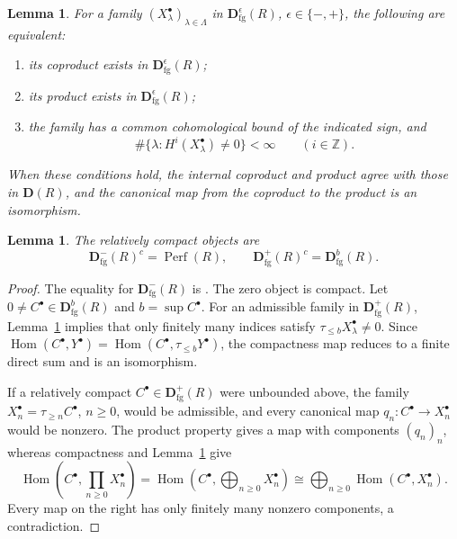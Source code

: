 \documentclass[11pt]{amsart}
\numberwithin{equation}{section}
\newtheorem{lemma}[theorem]{Lemma}
\theoremstyle{definition}
\theoremstyle{remark}
\DeclareMathOperator{\Perf}{Perf}
\DeclareMathOperator{\Hom}{Hom}
\newcommand{\D}{\mathbf D}
\newcommand{\fg}{\mathrm{fg}}
\begin{document}
\begin{lemma}\label{lem:admissible-coproducts}
For a family $(X^{\bullet}_\lambda)_{\lambda\in\Lambda}$ in
$\D^\epsilon_{\fg}(R)$, $\epsilon\in\{-,+\}$, the following are equivalent:
\begin{enumerate}[label=(\roman*),leftmargin=*]
\item its coproduct exists in $\D^\epsilon_{\fg}(R)$;
\item its product exists in $\D^\epsilon_{\fg}(R)$;
\item the family has a common cohomological bound of the indicated sign, and
\begin{equation}\label{eq:admissible}
 \#\{\lambda:H^i(X^{\bullet}_\lambda)\ne0\}<\infty
 \qquad(i\in\mathbb Z).
\end{equation}
\end{enumerate}
When these conditions hold, the internal coproduct and product agree
with those in $\D(R)$, and the canonical map from the coproduct to the
product is an isomorphism.
\end{lemma}

\begin{lemma}\label{lem:relative-compact-objects}
The relatively compact objects are
\[
 \D^-_{\fg}(R)^c=\Perf(R),\qquad
 \D^+_{\fg}(R)^c=\D^b_{\fg}(R).
\]
\end{lemma}
\begin{proof}
The equality for $\D^-_{\fg}(R)$ is \cite[Proposition~2.1]{MT17}.
The zero object is compact. Let $0\ne C^{\bullet}\in\D^b_{\fg}(R)$
and $b=\sup C^{\bullet}$.
For an admissible family in $\D^+_{\fg}(R)$, Lemma~\ref{lem:admissible-coproducts}
implies that only finitely many indices satisfy
$\tau_{\leq b}X^{\bullet}_\lambda\ne0$.
Since $\Hom(C^{\bullet},Y^{\bullet})=
\Hom(C^{\bullet},\tau_{\leq b}Y^{\bullet})$, the compactness map reduces
to a finite direct sum and is an isomorphism.

If a relatively compact $C^{\bullet}\in\D^+_{\fg}(R)$ were unbounded
above, the family $X^{\bullet}_n=\tau_{\geq n}C^{\bullet}$, $n\geq0$,
would be admissible, and every canonical map
$q_n:C^{\bullet}\to X^{\bullet}_n$ would be nonzero.
The product property gives a map with components $(q_n)_n$, whereas
compactness and Lemma~\ref{lem:admissible-coproducts} give
\[
 \Hom\!\left(C^{\bullet},\prod_{n\geq0}X^{\bullet}_n\right)
 =\Hom\!\left(C^{\bullet},\bigoplus_{n\geq0}X^{\bullet}_n\right)
 \cong\bigoplus_{n\geq0}\Hom(C^{\bullet},X^{\bullet}_n).
\]
Every map on the right has only finitely many nonzero components,
a contradiction.
\end{proof}
\end{document}
